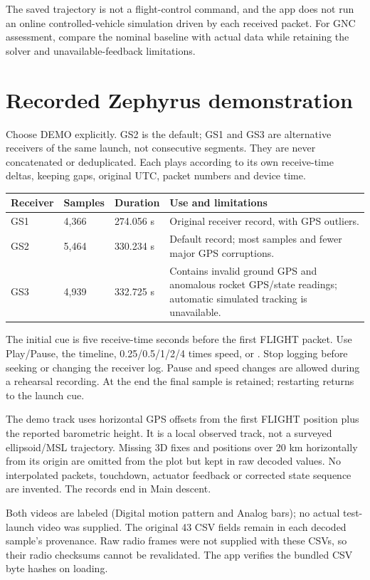 The saved trajectory is not a flight-control command, and the app does not
run an online controlled-vehicle simulation driven by each received packet.
For GNC assessment, compare the nominal baseline with actual data while retaining
the solver and unavailable-feedback limitations.

\section{Recorded Zephyrus demonstration}
Choose DEMO explicitly. GS2 is the default; GS1 and GS3 are alternative receivers
of the same launch, not consecutive segments. They are never concatenated or
deduplicated. Each plays according to its own receive-time deltas, keeping gaps,
original UTC, packet numbers and device time.

\begin{longtable}{@{}L{.16\linewidth}L{.16\linewidth}L{.18\linewidth}L{.41\linewidth}@{}}
\toprule Receiver & Samples & Duration & Use and limitations \\\midrule\endhead
GS1 & 4,366 & 274.056 s & Original receiver record, with GPS outliers. \\
GS2 & 5,464 & 330.234 s & Default record; most samples and fewer major GPS corruptions. \\
GS3 & 4,939 & 332.725 s & Contains invalid ground GPS and anomalous rocket GPS/state readings; automatic simulated tracking is unavailable. \\
\bottomrule
\end{longtable}
The initial cue is five receive-time seconds before the first FLIGHT packet.
Use Play/Pause, the timeline, 0.25/0.5/1/2/4 times speed,  or
. Stop logging before seeking or changing the receiver log.
Pause and speed changes are allowed during a rehearsal recording.
At the end the final sample is retained; restarting returns to the launch cue.

The demo track uses horizontal GPS offsets from the first FLIGHT position plus
the reported barometric height. It is a local observed track, not a surveyed
ellipsoid/MSL trajectory. Missing 3D fixes and positions over 20 km horizontally
from its origin are omitted from the plot but kept in raw decoded values.
No interpolated packets, touchdown, actuator feedback or corrected state
sequence are invented. The records end in Main descent.

Both videos are labeled  (Digital motion pattern and Analog bars); no actual test-launch video was supplied.
The original 43 CSV fields remain in each decoded sample's provenance. Raw radio
frames were not supplied with these CSVs, so their radio checksums cannot be
revalidated. The app verifies the bundled CSV byte hashes on loading.

